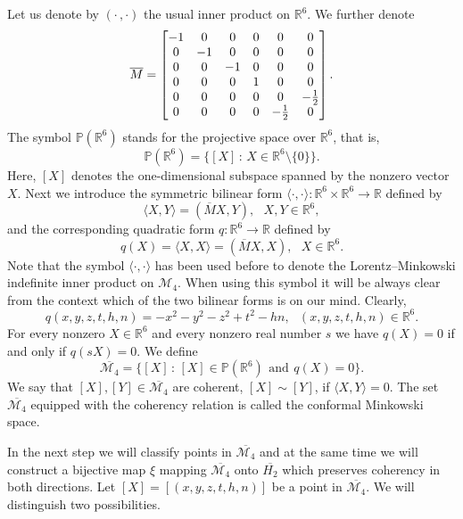 \documentclass[10pt,a4paper]{amsart}
\providecommand{\index}[1]{}
\newcommand\cM{{\mathcal{M}}}
\newcommand\oH{{\overline{H_2}}}
\theoremstyle{definition}
\theoremstyle{remark}
\numberwithin{subsection}{section}
\numberwithin{equation}{section}
\begin{document}
Let us denote by $(\cdot \, , \cdot)$ \index{$(\cdot \, , \cdot)$} the usual inner product on $\mathbb{R}^6$. We further denote 
\[
\index{$M$2@$\overline{M}$}
\overline{M} = \left[ \begin{matrix}   -1 & 0 & 0 & 0 & 0 & 0 \cr
0 & -1 & 0 & 0 & 0 & 0 \cr
0 & 0 & -1 & 0 & 0 & 0 \cr
0 & 0 & 0 & 1 & 0 & 0 \cr  
 0 & 0 & 0 & 0 & 0 & -{1\over 2}\cr
0 & 0 & 0 & 0 & -{1 \over 2} & 0 \cr\end{matrix} \right] .
\]
The symbol $\mathbb{P} ( \mathbb{R}^6 )$ \index{$P(R^6)$@$\mathbb{P} ( \mathbb{R}^6 )$} stands for the projective space over $\mathbb{R}^6$, that is,
\[
\mathbb{P} ( \mathbb{R}^6 ) = \{ [X] \, : \, X \in  \mathbb{R}^6 \setminus \{ 0 \} \}.
\]
Here, $[X]$ \index{$X$@$[X]$} denotes the one-dimensional subspace spanned by the nonzero vector $X$. Next we introduce the symmetric bilinear form $\langle \cdot , \cdot \rangle \colon  \mathbb{R}^6 \times  \mathbb{R}^6 \to  \mathbb{R}$ defined by
\[
\langle X , Y \rangle = (\overline{M} X,Y), \ \ \ X,Y \in  \mathbb{R}^6 ,
\]
and the corresponding quadratic form $q\colon \mathbb{R}^6 \to  \mathbb{R}$ \index{$q$} defined by
\[
q(X) = \langle X,X \rangle = ( \overline{M} X,X), \ \ \ X \in  \mathbb{R}^6 .
\]
Note that the symbol $\langle \cdot , \cdot \rangle$ has been used before to denote the Lorentz--Minkowski indefinite inner product on $\mathcal{M}_4$. When using this symbol it will be always clear from the context which of the two bilinear forms is on our mind. 
Clearly,
\begin{equation}\label{tuniz}\index{$\langle\cdot, \cdot\rangle$}
q(x,y,z,t,h,n) = -x^2 -y^2-z^2 + t^2 -hn , \ \ \ (x,y,z,t,h,n) \in \mathbb{R}^6 .
\end{equation}
For every nonzero $X \in \mathbb{R}^6$ and every nonzero real number $s$ we have  $q(X)=0$ if and only if $q(sX) =0$. We define
\[
\overline{ \mathcal{M}_4 } = \{ [X] \, : \, [X] \in \mathbb{P} ( \mathbb{R}^6 ) \, \ \text{and} \ \, q(X) = 0 \}.
\]
We say that $[X], [Y] \in \overline{ \mathcal{M}_4 }$ are coherent, $[X] \sim [Y]$\index{$\sim$4@$\sim$ (on $\overline{\cM_4}$)}, if $\langle X , Y \rangle = 0$. The set  $\overline{ \mathcal{M}_4 }$ equipped with the coherency relation is called the conformal Minkowski space.

In the next step we will classify points in $\overline{ \mathcal{M}_4 }$ and at the same time we will construct a bijective map $\xi$ \index{$xi$@$\xi$} mapping $\overline{ \mathcal{M}_4 }$ onto $\oH$ which preserves coherency in both directions. Let $[X] = [ (x,y,z,t,h,n) ]$ be a point in $\overline{ \mathcal{M}_4 }$. We will distinguish two possibilities.
\end{document}
